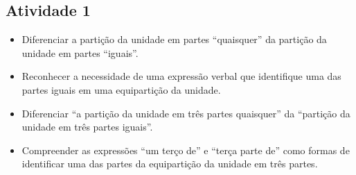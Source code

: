 \begin{multicols}{2}

\subsection{Atividade 1}    \vspace{.1cm}

\begin{itemize} %
    \item       Diferenciar a partição da unidade em partes ``quaisquer'' da partição da unidade em partes       ``iguais''. 
    \item       Reconhecer a necessidade de uma expressão verbal que identifique uma das partes iguais em uma equipartição da unidade.
    \item       Diferenciar ``a partição da unidade em três partes quaisquer'' da ``partição da unidade em três partes iguais''.
    \item       Compreender as expressões ``um terço de'' e ``terça parte de'' como formas de identificar uma das partes da equipartição da unidade em três partes.
\end{itemize} %
 \vspace{.1cm}

   \vspace{.1cm}


\end{multicols}
